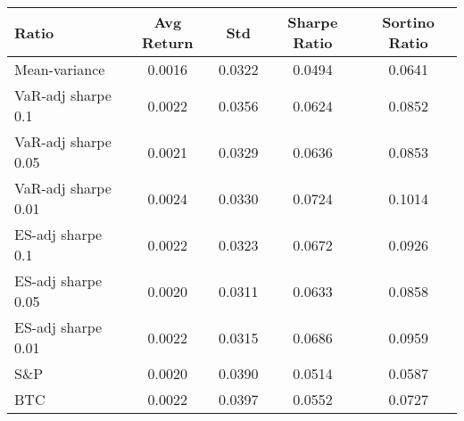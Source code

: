\begin{tabular}{lcccc}
\toprule
Ratio & Avg Return & Std & Sharpe Ratio & Sortino Ratio\\
\midrule
Mean-variance & 0.0016 & 0.0322 & 0.0494 & 0.0641\\
VaR-adj sharpe 0.1 & 0.0022 & 0.0356 & 0.0624 & 0.0852\\
VaR-adj sharpe 0.05 & 0.0021 & 0.0329 & 0.0636 & 0.0853\\
VaR-adj sharpe 0.01 & 0.0024 & 0.0330 & 0.0724 & 0.1014\\
ES-adj sharpe 0.1 & 0.0022 & 0.0323 & 0.0672 & 0.0926\\
ES-adj sharpe 0.05 & 0.0020 & 0.0311 & 0.0633 & 0.0858\\
ES-adj sharpe 0.01 & 0.0022 & 0.0315 & 0.0686 & 0.0959\\
S\&P & 0.0020 & 0.0390 & 0.0514 & 0.0587\\
BTC & 0.0022 & 0.0397 & 0.0552 & 0.0727\\
\bottomrule
\end{tabular}
